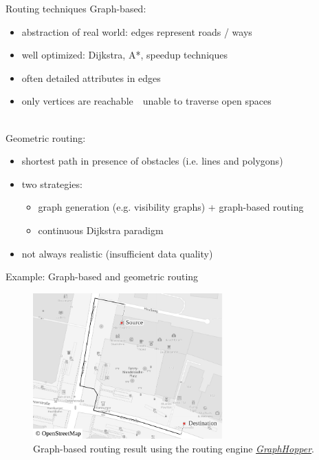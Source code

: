 \documentclass[xcolor={x11names}]{beamer}
\renewcommand{\n}{\hfill\\[0.5ex]}
\newcommand{\nn}{\hfill\\[2ex]}
\newenvironment{figcenter}
{%
	\parskip=0pt%
	\par%
	\nopagebreak%
	\centering%
}%
{%
	\par%
	\noindent%
	\ignorespacesafterend%
}
\begin{document}
		\begin{frame}{Routing techniques}
			Graph-based:\n
			\begin{itemize}
				\item abstraction of real world: edges represent roads / ways
				\item well optimized: Dijkstra, A*, speedup techniques
				\item often detailed attributes in edges
				\pause
				\item only vertices are reachable\ \textrightarrow\ unable to traverse open spaces
			\end{itemize}
			\nn
			\pause
			Geometric routing:\n
			\begin{itemize}
				\item shortest path in presence of obstacles (i.e. lines and polygons)
				\item two strategies:
				\begin{itemize}
					\item graph generation (e.g. visibility graphs) + graph-based routing
					\item continuous Dijkstra paradigm
				\end{itemize}
				\pause
				\item not always realistic (insufficient data quality)
			\end{itemize}
		\end{frame}
	
		\begin{frame}{Example: Graph-based and geometric routing}
			\begin{figure}[t]
				\begin{figcenter}
					\includegraphics[width=0.65\textwidth]{images/qgis-routing-osterstrasse_routing.pdf}
				\end{figcenter}
				\caption{Graph-based routing result using the routing engine \href{https://www.osm.org/directions?engine=graphhopper\_foot\&route=53.57657,9.95210;53.57601,9.95268}{\emph{GraphHopper}}.}
			\end{figure}
		\end{frame}
	
\end{document}
